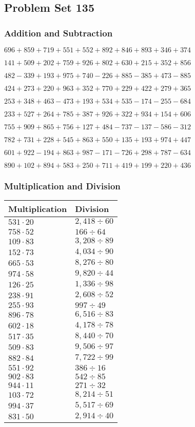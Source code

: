 \hypertarget{problem-set-135}{%
\subsection{Problem Set 135}\label{problem-set-135}}

\hypertarget{addition-and-subtraction}{%
\subsubsection{Addition and
Subtraction}\label{addition-and-subtraction}}

\(696 +859 +719 +551 +552 +892 +846 +893 +346 +374\)

\(141 +509 +202 +759 +926 +802 +630 +215 +352 +856\)

\(482 - 339 +193 +975 +740 - 226 +885 - 385 +473 - 885\)

\(424 +273 +220 +963 +352 +770 +229 +422 +279 +365\)

\(253 +348 +463 - 473 +193 +534 +535 - 174 - 255 - 684\)

\(233 +527 +264 +785 +387 +926 +322 +934 +154 +606\)

\(755 +909 +865 +756 +127 +484 - 737 - 137 - 586 - 312\)

\(782 +731 +228 +545 +863 +550 +135 +193 +974 +447\)

\(601 +922 - 194 +863 +987 - 171 - 726 +298 +787 - 634\)

\(890 +102 +894 +583 +250 +711 +419 +199 +220 +436\)

\hypertarget{multiplication-and-division}{%
\subsubsection{Multiplication and
Division}\label{multiplication-and-division}}

\begin{longtable}[]{@{}ll@{}}
\toprule
Multiplication & Division\tabularnewline
\midrule
\endhead
\(531 \cdot 20\) & \(2,418÷60\)\tabularnewline
\(758 \cdot 52\) & \(166÷64\)\tabularnewline
\(109 \cdot 83\) & \(3,208÷89\)\tabularnewline
\(152 \cdot 73\) & \(4,034÷90\)\tabularnewline
\(665 \cdot 53\) & \(8,276÷80\)\tabularnewline
\(974 \cdot 58\) & \(9,820÷44\)\tabularnewline
\(126 \cdot 25\) & \(1,336÷98\)\tabularnewline
\(238 \cdot 91\) & \(2,608÷52\)\tabularnewline
\(255 \cdot 93\) & \(997 ÷ 49\)\tabularnewline
\(896 \cdot 78\) & \(6,516÷83\)\tabularnewline
\(602 \cdot 18\) & \(4,178÷78\)\tabularnewline
\(517 \cdot 35\) & \(8,440÷70\)\tabularnewline
\(509 \cdot 83\) & \(9,506÷97\)\tabularnewline
\(882 \cdot 84\) & \(7,722÷99\)\tabularnewline
\(551 \cdot 92\) & \(386÷16\)\tabularnewline
\(902 \cdot 83\) & \(542÷85\)\tabularnewline
\(944 \cdot 11\) & \(271÷32\)\tabularnewline
\(103 \cdot 72\) & \(8,214÷51\)\tabularnewline
\(994 \cdot 37\) & \(5,517÷69\)\tabularnewline
\(831 \cdot 50\) & \(2,914÷40\)\tabularnewline
\bottomrule
\end{longtable}
